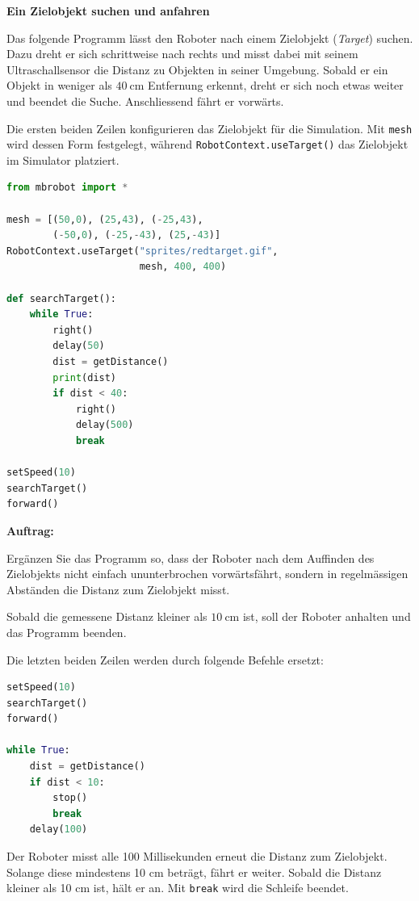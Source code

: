 \begin{myexercise}
    \textbf{Ein Zielobjekt suchen und anfahren}

    Das folgende Programm lässt den Roboter nach einem
    Zielobjekt (\emph{Target}) suchen. Dazu dreht er sich
    schrittweise nach rechts und misst dabei mit seinem
    Ultraschallsensor die Distanz zu Objekten in seiner
    Umgebung. Sobald er ein Objekt in weniger als
    \(\SI{40}{\centi\meter}\) Entfernung erkennt,
    dreht er sich noch etwas weiter und beendet die Suche.
    Anschliessend fährt er vorwärts.

    Die ersten beiden Zeilen konfigurieren das Zielobjekt
    für die Simulation. Mit \texttt{mesh} wird dessen
    Form festgelegt, während \texttt{RobotContext.useTarget()}
    das Zielobjekt im Simulator platziert.

    \begin{lstlisting}[language=Python]
from mbrobot import *

mesh = [(50,0), (25,43), (-25,43),
        (-50,0), (-25,-43), (25,-43)]
RobotContext.useTarget("sprites/redtarget.gif",
                       mesh, 400, 400)

def searchTarget():
    while True:
        right()
        delay(50)
        dist = getDistance()
        print(dist)
        if dist < 40:
            right()
            delay(500)
            break

setSpeed(10)
searchTarget()
forward()
    \end{lstlisting}

    \textbf{Auftrag:}

    Ergänzen Sie das Programm so, dass der Roboter nach
    dem Auffinden des Zielobjekts nicht einfach
    ununterbrochen vorwärtsfährt, sondern in regelmässigen
    Abständen die Distanz zum Zielobjekt misst.

    Sobald die gemessene Distanz kleiner als
    \(\SI{10}{\centi\meter}\) ist, soll der Roboter
    anhalten und das Programm beenden.

    \begin{myanswer}
        Die letzten beiden Zeilen werden durch
        folgende Befehle ersetzt:

        \begin{lstlisting}[language=Python]
setSpeed(10)
searchTarget()
forward()

while True:
    dist = getDistance()
    if dist < 10:
        stop()
        break
    delay(100)
        \end{lstlisting}

        Der Roboter misst alle 100 Millisekunden erneut
        die Distanz zum Zielobjekt. Solange diese mindestens
        10 cm beträgt, fährt er weiter. Sobald die
        Distanz kleiner als 10 cm ist, hält er an.
        Mit \texttt{break} wird die Schleife beendet.
    \end{myanswer}
\end{myexercise}


